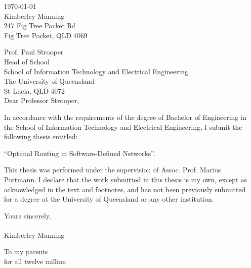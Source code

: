 \begin{flushright}
        \today\\
        Kimberley Manning\\
        247 Fig Tree Pocket Rd\\
        Fig Tree Pocket, QLD 4069\\
        \medskip

\end{flushright}
\begin{flushleft}
  Prof. Paul Strooper\\
  Head of School\\
  School of Information Technology and Electrical Engineering\\
  The University of Queensland\\
  St Lucia, QLD 4072\\
  \bigskip\bigskip
  Dear Professor Strooper,\\
\end{flushleft}
In accordance with the requirements of the degree of Bachelor of Engineering in the School of Information Technology and Electrical Engineering, I submit the following thesis entitled:
\begin{center}
        ``Optimal Routing in Software-Defined Networks''.\\
\end{center}
This thesis was performed under the supervision of Assoc. Prof. Marius Portmann. I declare that the work submitted in this thesis is my own, except as acknowledged in the text and footnotes, and has not been previously submitted for a degree at the University of Queensland or any other institution.



\begin{flushleft}
        \medskip
        Yours sincerely,\\
        \bigskip
        \emph\\
        \bigskip
    Kimberley Manning
\end{flushleft}

\cleardoublepage
\vspace*{70mm}
\begin{center}
\renewcommand{\baselinestretch}{1.0}
\sl


To my parents \\
for all twelve million


\end{center}

